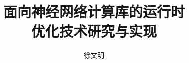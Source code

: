 \documentclass[master]{ustcthesis}
\title{面向神经网络计算库的运行时\\优化技术研究与实现}
\author{徐文明}
\begin{document}
%

\maketitle
\makestatement

\frontmatter

\tableofcontents
% 

\mainmatter









\appendix
% 

\backmatter
\cleardoublepage

\cleardoublepage
%
\end{document}

